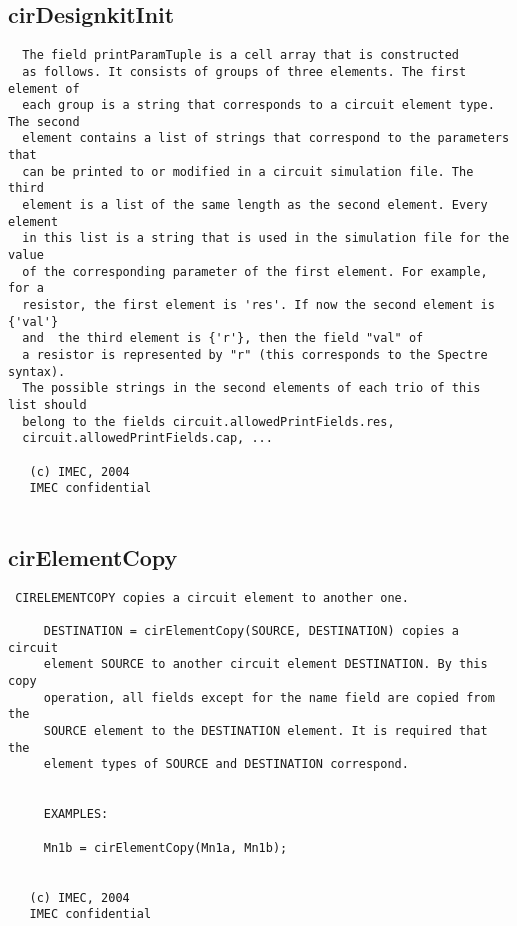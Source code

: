 \subsection{cirDesignkitInit}
\label{sec:cirDesignkitInit}
\begin{verbatim}
  The field printParamTuple is a cell array that is constructed
  as follows. It consists of groups of three elements. The first element of
  each group is a string that corresponds to a circuit element type. The second
  element contains a list of strings that correspond to the parameters that
  can be printed to or modified in a circuit simulation file. The third
  element is a list of the same length as the second element. Every element
  in this list is a string that is used in the simulation file for the value
  of the corresponding parameter of the first element. For example, for a
  resistor, the first element is 'res'. If now the second element is {'val'}
  and  the third element is {'r'}, then the field "val" of
  a resistor is represented by "r" (this corresponds to the Spectre syntax).
  The possible strings in the second elements of each trio of this list should
  belong to the fields circuit.allowedPrintFields.res,
  circuit.allowedPrintFields.cap, ... 
 
   (c) IMEC, 2004
   IMEC confidential 
 

\end{verbatim}

\newpage
\subsection{cirElementCopy}
\label{sec:cirElementCopy}
\begin{verbatim}
 CIRELEMENTCOPY copies a circuit element to another one.
 
     DESTINATION = cirElementCopy(SOURCE, DESTINATION) copies a circuit
     element SOURCE to another circuit element DESTINATION. By this copy
     operation, all fields except for the name field are copied from the
     SOURCE element to the DESTINATION element. It is required that the
     element types of SOURCE and DESTINATION correspond. 
 
 
     EXAMPLES:
 
     Mn1b = cirElementCopy(Mn1a, Mn1b);
 
 
   (c) IMEC, 2004
   IMEC confidential 
 

\end{verbatim}

